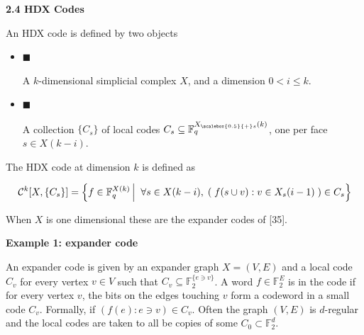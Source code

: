 \par\medskip\noindent\textbf{
2.4 HDX Codes}\par




An HDX code is defined by two objects\par


\begin{itemize}


\item[] 
$\blacksquare$ 


A $k$-dimensional simplicial complex $X$, and a dimension $0<i\leq k$.\par





\item[] 
$\blacksquare$ 


A collection $\{C_{s}\}$ of local codes $C_{s}\subseteq\mathbb{F}_{q}^{{X}_{\scalebox{0.5}{+}s}(k)}$, one per face $s\in X(k-i)$.\par





\end{itemize}


The HDX code at dimension $k$ is defined as\par


\[\begin{gathered}
{\cal C}^{k}[X,\{C_{s}\}]=\left\{f\in\mathbb{F}_{q}^{X(k)}\left|\;\vphantom{f\in\mathbb{F}_{q}^{X(k)}\forall s\in X(k-i),\;(\;f(s\cup v):v\in X_{s}(i-1)\;)\in C_{s}}\right.\forall s\in X(k-i),\;(\;f(s\cup v):v\in X_{s}(i-1)\;)\in C_{s}\right\}
\end{gathered}\]


When $X$ is one dimensional these are the expander codes of [35].\par




\par\medskip\noindent\textbf{Example 1: expander code}\par




An expander code is given by an expander graph $X=(V,E)$ and a local code $C_{v}$ for every vertex $v\in V$ such that $C_{v}\subseteq\mathbb{F}_{2}^{\{e\ni v\}}$. A word $f\in\mathbb{F}_{2}^{E}$ is in the code if for every vertex $v$, the bits on the edges touching $v$ form a codeword in a small code $C_{v}$. Formally, if $(f(e):e\ni v)\in C_{v}$. Often the graph $(V,E)$ is $d$-regular and the local codes are taken to all be copies of some $C_{0}\subset\mathbb{F}_{2}^{d}$.\par




